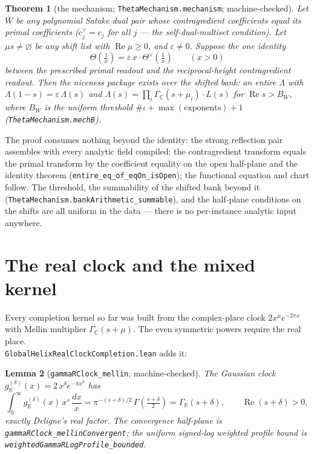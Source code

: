\documentclass[11pt]{article}
\newtheorem{theorem}{Theorem}
\newtheorem{lemma}[theorem]{Lemma}
\newcommand{\Gm}{\Gamma_{\mathbb C}}
\newcommand{\Gr}{\Gamma_{\mathbb R}}
\begin{document}
\begin{theorem}[the mechanism; \texttt{ThetaMechanism.mechanism}; machine-checked]
\label{thm:mech}
Let $W$ be any polynomial Satake dual pair whose contragredient coefficients equal its
primal coefficients ($c^\vee_j=c_j$ for all $j$ --- the self-dual-multiset condition).
Let $\mu s\neq\varnothing$ be any shift list with $\operatorname{Re}\mu\ge 0$, and
$\varepsilon\neq 0$.  Suppose the \emph{one identity}
\[
\Theta\!\left(\tfrac1x\right)
=\varepsilon\,x\cdot\Theta^\vee\!\left(\tfrac1x\right)
\qquad(x>0)
\]
between the prescribed primal readout and the reciprocal-height contragredient readout.
Then the niceness package exists over the shifted bank: an entire $\Lambda$ with
$\Lambda(1-s)=\varepsilon\,\Lambda(s)$ and
$\Lambda(s)=\prod_i\Gm(s+\mu_i)\cdot L(s)$ for
$\operatorname{Re}s>B_W$, where $B_W$ is the uniform threshold
$\#\iota+\max(\text{exponents})+1$ (\texttt{ThetaMechanism.mechB}).
\end{theorem}

The proof consumes nothing beyond the identity: the strong reflection pair assembles
with every analytic field compiled; the contragredient transform equals the primal
transform by the coefficient equality on the open half-plane and the identity theorem
(\texttt{entire\_eq\_of\_eqOn\_isOpen}); the functional equation and chart follow.  The
threshold, the summability of the shifted bank beyond it
(\texttt{ThetaMechanism.bankArithmetic\_summable}), and the half-plane conditions on
the shifts are all uniform in the data --- there is no per-instance analytic input
anywhere.

\section{The real clock and the mixed kernel}

Every completion kernel so far was built from the complex-place clock
$2x^{\mu}e^{-2\pi x}$ with Mellin multiplier $\Gm(s+\mu)$.  The even symmetric powers
require the real place.\\
\texttt{GlobalHelixRealClockCompletion.lean} adds it:

\begin{lemma}[\texttt{gammaRClock\_mellin}; machine-checked]\label{lem:clock}
The Gaussian clock $g_{\mathbb R}^{(\delta)}(x)=2\,x^{\delta}e^{-\pi x^2}$ has
\[
\int_0^\infty g_{\mathbb R}^{(\delta)}(x)\,x^{s}\,\frac{dx}{x}
=\pi^{-(s+\delta)/2}\,\Gamma\!\left(\tfrac{s+\delta}2\right)=\Gr(s+\delta),
\qquad \operatorname{Re}(s+\delta)>0,
\]
exactly Deligne's real factor.  The convergence half-plane is
\texttt{gammaRClock\_mellinConvergent}; the uniform signed-log weighted profile bound
is \texttt{weightedGammaRLogProfile\_bounded}.
\end{lemma}
\end{document}
